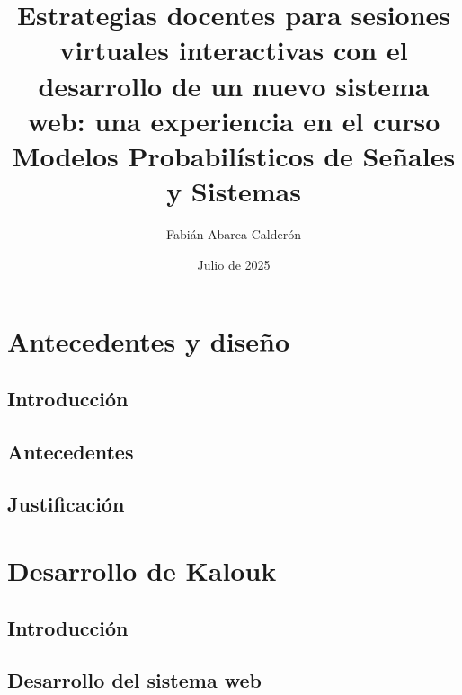 \documentclass{memoir}
\title{Estrategias docentes para sesiones virtuales interactivas con el desarrollo de un nuevo sistema web: una experiencia en el curso Modelos Probabilísticos de Señales y Sistemas}
\author{Fabián Abarca Calderón}
\date{Julio de 2025}
\begin{document}
\maketitle
\newpage
\begin{abstract}
\end{abstract}
\newpage
\tableofcontents

\part{Antecedentes y diseño}

\chapter*{Introducción}


\chapter{Antecedentes}


\chapter{Justificación}


\part{Desarrollo de Kalouk}

\chapter*{Introducción}


\chapter{Desarrollo del sistema web}
\end{document}
